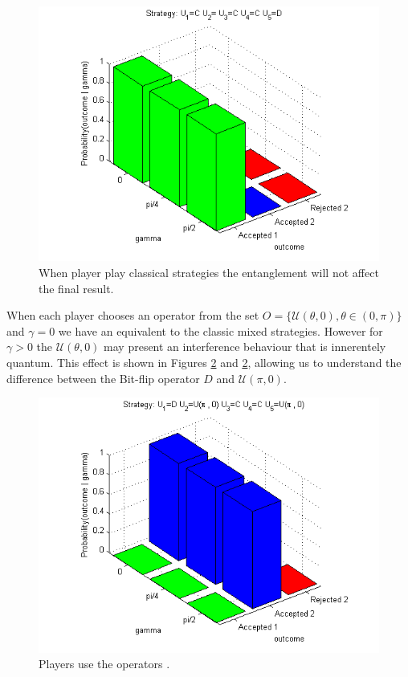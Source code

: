 \begin{table}[h]
\begin{figure}[h]
\centering 
\includegraphics[scale=0.80]{Figures/1.5qubit/CDCCD.png}
\caption{When player play classical strategies the entanglement will not affect the final result. }
\label{fig:pg_3players_99_0_1}
\end{figure}

When each player chooses an operator from the set $O = \{ \mathcal{U} ( \theta , 0) , \theta \in (0, \pi) \}$ and $\gamma=0$ we have an equivalent to the classic mixed strategies. However for $\gamma >0$ the $\mathcal{U} ( \theta , 0)$ may present an interference behaviour that is innerentely quantum. This effect is shown in Figures \ref{fig:pg_3players_99_0_1:2} and \ref{fig:pg_3players_99_0_1:2}, allowing us to understand the difference between the Bit-flip operator $D$ and $\mathcal{U} ( \pi , 0)$.



\begin{figure}[h]
\centering 
\includegraphics[scale=0.80]{Figures/1.5qubit/DUpi0CCUpi0.png}
\caption{Players use the operators . }
\label{fig:pg_3players_99_0_1:2}
\end{figure}


\end{table}
